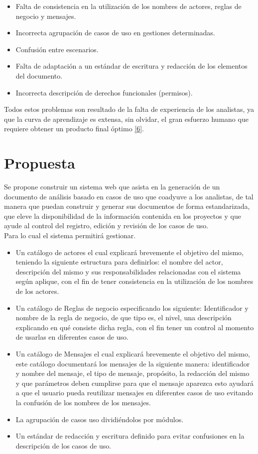 \begin{itemize}
	\item Falta de consistencia en la utilización de los nombres de actores, reglas de negocio y mensajes.
	\item Incorrecta agrupación de casos de uso en gestiones determinadas.
	\item Confusión entre escenarios.
	\item Falta de adaptación a un estándar de escritura y redacción de los elementos del documento.
	\item Incorrecta descripción de derechos funcionales (permisos).
\end{itemize}

Todos estos problemas son resultado de la falta de experiencia de los analistas, ya que la curva de aprendizaje es extensa, sin olvidar, el gran esfuerzo humano que requiere obtener un producto final óptimo \hyperlink{b06}{[6]}.

\section{Propuesta}

Se propone construir un sistema web que asista en la generación de un documento de análisis basado en casos de uso que coadyuve a los analistas, de tal manera que puedan construir y generar sus documentos de forma estandarizada, que eleve la disponibilidad de la información contenida en los proyectos y que ayude al control del registro, edición y revisión de los casos de uso.\\

Para lo cual el sistema permitirá gestionar.

\begin{itemize}
	\item Un catálogo de actores el cual explicará brevemente el objetivo del mismo, teniendo la siguiente estructura para definirlos: el nombre del actor, descripción del mismo y sus responsabilidades relacionadas con el sistema según aplique, con el fin de tener consistencia en la utilización de los nombres de los actores.
	\item Un catálogo de Reglas de negocio especificando los siguiente: Identificador y nombre de la regla de negocio, de que tipo es, el nivel, una descripción explicando en qué consiste dicha regla, con el fin tener un control al momento de usarlas en diferentes casos de uso.
	\item Un catálogo de Mensajes el cual explicará brevemente el objetivo del mismo, este catálogo documentará los mensajes de la siguiente manera: identificador y nombre del mensaje, el tipo de mensaje, propósito, la redacción del mismo y que parámetros deben cumplirse para que el mensaje aparezca esto ayudará a que el usuario pueda reutilizar mensajes en diferentes casos de uso evitando la confusión de los nombres de los mensajes.
	\item La agrupación de casos uso dividiéndolos por módulos.
	\item Un estándar de redacción y escritura definido para evitar confusiones en la descripción de los casos de uso.
\end{itemize}
	
